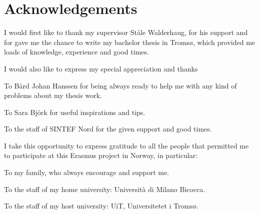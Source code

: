 \clearpage 
\chapter{Acknowledgements}

I would first like to thank my supervisor Ståle Walderhaug, for his support and for gave me the chance to write my bachelor thesis in Tromsø, which provided me loads of knowledge, experience and good times.

\vspace{+0.5cm}

I would also like to express my special appreciation and thanks 

\hspace{1cm} To Bård Johan Hanssen for being always ready to help me with any kind of problems about my thesis work.

\hspace{1cm} To Sara Björk for useful inspirations and tips. 

\hspace{1cm}  To the staff of SINTEF Nord for the given support and good times. 

\vspace{+0.5cm}
 
I take this opportunity to express gratitude to all the people that permitted me to participate at this Erasmus project in Norway, in particular:

\hspace{1cm} To my family, who always encourage and support me.

\hspace{1cm}  To the staff of my home university: Università di Milano Bicocca.

\hspace{1cm}  To the staff of my host university: UiT, Universitetet i Tromsø.

 	 
 	 
 	 


